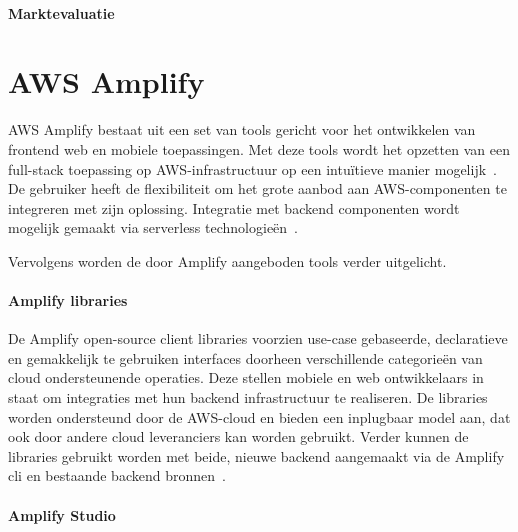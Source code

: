 \paragraph{Marktevaluatie}



\section{AWS Amplify}
\label{sec:service-amplify}

AWS Amplify bestaat uit een set van tools gericht voor het ontwikkelen van frontend web en mobiele toepassingen.
Met deze tools wordt het opzetten van een full-stack toepassing op AWS-infrastructuur op een intuïtieve manier mogelijk~\autocite{AWSCopilotOverview}.
De gebruiker heeft de flexibiliteit om het grote aanbod aan AWS-componenten te integreren met zijn oplossing.
Integratie met backend componenten wordt mogelijk gemaakt via serverless technologieën~\autocite{Kandaswamy2022}.

Vervolgens worden de door Amplify aangeboden tools verder uitgelicht.

\paragraph{Amplify libraries}

De Amplify open-source client libraries voorzien use-case gebaseerde, declaratieve en gemakkelijk te gebruiken interfaces
doorheen verschillende categorieën van cloud ondersteunende operaties.
Deze stellen mobiele en web ontwikkelaars in staat om integraties met hun backend infrastructuur te realiseren.
De libraries worden ondersteund door de AWS-cloud en bieden een inplugbaar model aan, dat ook door andere cloud leveranciers kan worden gebruikt.
Verder kunnen de libraries gebruikt worden met beide, nieuwe backend aangemaakt via de Amplify \acrshort{cli} en bestaande backend bronnen~\autocite{AWSAmplifyDocs}.

\paragraph{Amplify Studio}

